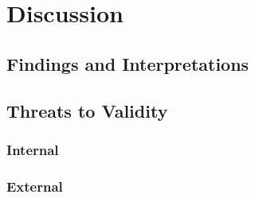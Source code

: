 
\chapter{Discussion}\label{chapter:discussion}

\section{Findings and Interpretations}

\section{Threats to Validity}

\subsection*{Internal}

\subsection*{External}